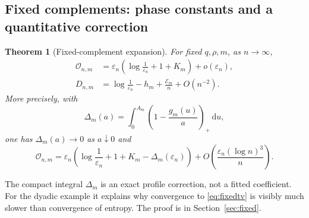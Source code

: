 \documentclass[11pt,a4paper]{article}
\numberwithin{equation}{section}
\newtheorem{theorem}{Theorem}[section]
\theoremstyle{definition}
\theoremstyle{remark}
\newcommand{\eps}{\varepsilon}
\newcommand{\ov}{\mathcal O}
\newcommand{\dd}{\mathrm d}
\begin{document}
\subsection{Fixed complements: phase constants and a quantitative correction}
\begin{theorem}[Fixed-complement expansion]\label{thm:fixed}
For fixed $q,\rho,m$, as $n\to\infty$,
\begin{align}
\ov_{n,m}
 &=\eps_n\left(\log\frac1{\eps_n}+1+K_m\right)+o(\eps_n),
 \label{eq:fixedtv}\\
D_{n,m}
 &=\log\frac1{\eps_n}-h_m+\frac{\mathscr E_m}{n}+O(n^{-2}).
 \label{eq:fixedkl}
\end{align}
More precisely, with
\begin{equation}\label{eq:deficit}
\Delta_m(a)=\int_0^{A_m}\left(1-\frac{g_m(u)}a\right)_+\,\dd u,
\end{equation}
one has $\Delta_m(a)\to0$ as $a\downarrow0$ and
\begin{equation}\label{eq:correctedtv}
\ov_{n,m}=\eps_n\left(\log\frac1{\eps_n}+1+K_m-
                  \Delta_m(\eps_n)\right)
       +O\!\left(\frac{\eps_n(\log n)^3}{n}\right).
\end{equation}
\end{theorem}
The compact integral $\Delta_m$ is an exact profile correction, not a
fitted coefficient. For the dyadic example it explains why convergence
to \eqref{eq:fixedtv} is visibly much slower than convergence of entropy.
The proof is in Section~\ref{sec:fixed}.
\end{document}
